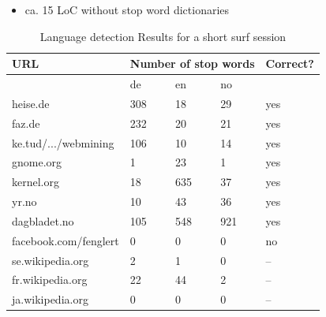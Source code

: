 \begin{frame}[c]
	
	\begin{itemize}
	
	\begin{itemize}
		\item Split the text between the '<p>' and '</p>' tags
		\item Count the occurrence of the stop words for german, english and norwegian
		\item Display the icon for the language with the most stop words
	\end{itemize}
		\item ca. 15 LoC without stop word dictionaries
\end{itemize}
\end{frame}

\begin{frame}[c]
	\begin{table}
		\begin{tabular}{|l|l|l|l|l|}
		\hline 
		URL & \multicolumn{3}{|c|}{Number of stop words} & Correct? \\
		\hline 
		 & de & en & no & \\
		 \hline 
		heise.de & 308 & 18 & 29 & yes\\
		faz.de & 232 & 20 & 21 & yes\\
		ke.tud/.../webmining & 106 & 10 & 14 & yes\\
		gnome.org & 1 & 23 & 1 & yes\\
		kernel.org & 18 & 635 & 37 & yes\\
		yr.no & 10 & 43 & 36 & yes\\
		dagbladet.no & 105 & 548 & 921 & yes\\
		facebook.com/fenglert & 0 & 0 & 0 & no\\
		se.wikipedia.org & 2 & 1 & 0 & -- \\
		fr.wikipedia.org & 22 & 44 & 2 & -- \\
		ja.wikipedia.org & 0 & 0 & 0 & -- \\
		\hline 
		\end{tabular}
		\caption{Language detection Results for a short surf session}
		\label{tblFFPluginResults}
	\end{table}
\end{frame}

